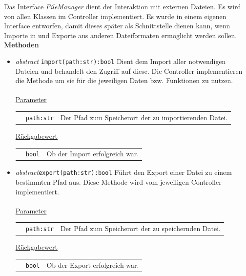 \documentclass{article}
\begin{document}
Das Interface \textit{FileManager} dient der Interaktion mit externen Dateien. Es wird von allen Klassen im Controller implementiert. Es wurde in einem eigenen Interface entworfen, damit dieses später als Schnittstelle dienen kann, wenn Importe in und Exporte aus anderen Dateiformaten ermöglicht werden sollen.
\newline \newline
\textbf{{Methoden}}
\begin{itemize}
\item \textit{\flqq{}abstract\frqq} \texttt{import(path:str):bool} \newline Dient dem Import aller notwendigen Dateien und behandelt den Zugriff auf diese. Die Controller implementieren die Methode um sie für die jeweiligen Daten bzw. Funktionen zu nutzen.
\\\\
\underline{{Parameter}}

\begin{tabular}{lll}
 & \texttt{path:str} & Der Pfad zum Speicherort der zu importierenden Datei. \\
\end{tabular}

\underline{{Rückgabewert}}

\begin{tabular}{lll}
 & \texttt{bool} & Ob der Import erfolgreich war. \\
\end{tabular}

\item \textit{\flqq{}abstract\frqq}\texttt{export(path:str):bool} \newline Führt den Export einer Datei zu einem bestimmten Pfad aus. Diese Methode wird vom jeweiligen Controller implementiert.
\\\\
\underline{{Parameter}}

\begin{tabular}{lll}
 & \texttt{path:str} & Der Pfad zum Speicherort der zu speichernden Datei. \\
\end{tabular}

\underline{{Rückgabewert}}

\begin{tabular}{lll}
 & \texttt{bool} & Ob der Export erfolgreich war. \\
\end{tabular}
\end{itemize}
\end{document}
